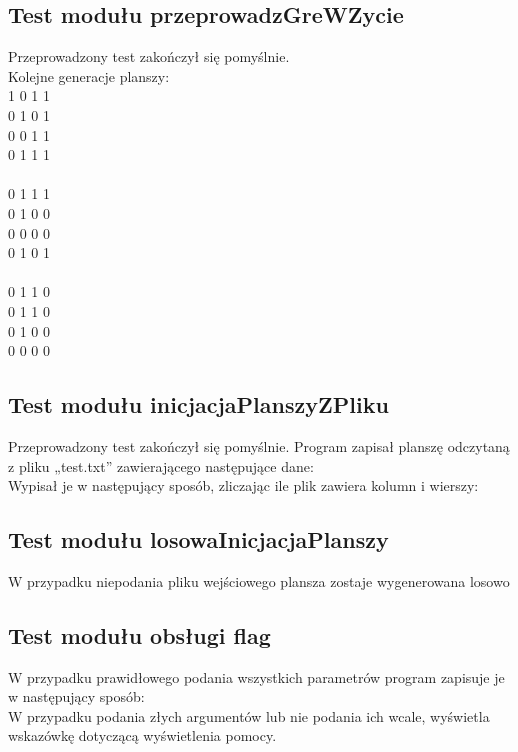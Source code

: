 \documentclass[10pt, oneside]{article}
\begin{document}
\subsection{Test modułu przeprowadzGreWZycie}
Przeprowadzony test zakończył się pomyślnie.\\ 
Kolejne generacje planszy:\\
1 0 1 1 \\
0 1 0 1 \\
0 0 1 1 \\
0 1 1 1 \\
\\
0 1 1 1 \\
0 1 0 0 \\
0 0 0 0 \\
0 1 0 1 \\
\\
0 1 1 0\\ 
0 1 1 0 \\
0 1 0 0 \\
0 0 0 0\\


\subsection{Test modułu inicjacjaPlanszyZPliku}
Przeprowadzony test zakończył się pomyślnie. Program zapisał planszę odczytaną z pliku „test.txt” zawierającego następujące dane:\\
 
Wypisał je w następujący sposób, zliczając ile plik zawiera kolumn i wierszy:\\
 

\subsection{Test modułu losowaInicjacjaPlanszy}
W przypadku niepodania pliku wejściowego plansza zostaje wygenerowana losowo\\
\subsection{Test modułu obsługi flag}

W przypadku prawidłowego podania wszystkich parametrów program zapisuje je w następujący sposób:\\

 
W przypadku podania złych argumentów lub nie podania ich wcale, wyświetla wskazówkę dotyczącą wyświetlenia pomocy.\\
\end{document}
